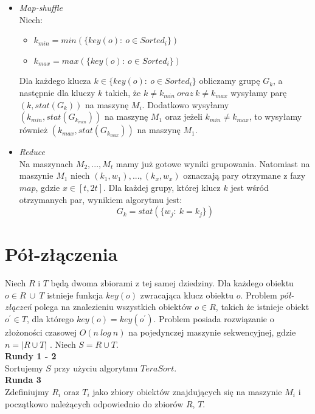 \documentclass[licencjacka]{pracamgr}
\begin{document}
\begin{itemize}
    \item \textit{Map-shuffle} \\
    Niech:
    \begin{itemize}
        \item \(k_{min} = min(\{key(o) : \ o \in Sorted_i \})\)
        \item \(k_{max} = max(\{key(o) : \ o \in Sorted_i \})\)
    \end{itemize}
    
    Dla każdego klucza \(k \in \{key(o): \ o \in Sorted_i\}\) obliczamy grupę \(G_k\), a następnie
    dla kluczy \(k\) takich, że \(k \neq k_{min} \ oraz \ k \neq k_{max}\) wysyłamy parę \((k, stat(G_k))\) na maszynę \(M_i\).
    Dodatkowo wysyłamy \((k_{min}, stat(G_{k_{min}}))\) na maszynę \(M_1\) oraz jeżeli \(k_{min} \neq k_{max}\), to wysyłamy również \((k_{max}, stat(G_{k_{max}}))\) na maszynę \(M_1\).

    \item \textit{Reduce} \\
    Na maszynach \(M_2, ..., M_t\) mamy już gotowe wyniki grupowania. Natomiast na maszynie \(M_1\) niech \((k_1, w_1), ..., (k_x, w_x)\) oznaczają pary otrzymane z fazy \(map\), gdzie \(x \in [t, 2t]\). Dla każdej grupy, której klucz \(k\) jest wśród otrzymanych par, wynikiem algorytmu jest:\\
            $$G_k = stat(\{w_j: \ k = k_j\})$$
\end{itemize}
\section{Pół-złączenia}
Niech \(R\) i \(T\) będą dwoma zbiorami z tej samej dziedziny. Dla każdego obiektu \(o \in R \ \cup \  T\) istnieje funkcja \(key(o)\) zwracająca klucz obiektu \(o\). Problem \textit{pół-złączeń} polega na znalezieniu wszystkich obiektów \(o \in R\), takich że istnieje obiekt \(o^\prime \in T\), dla którego \(key(o) = key(o^\prime)\). Problem posiada rozwiązanie o złożoności czasowej \(O(n \ log \  n)\) na pojedynczej maszynie sekwencyjnej, gdzie \(n = |R \cup T|\) \cite{tao2013minimal}.
Niech \(S = R \cup T\). \\

\textbf{Rundy 1 - 2} \\
Sortujemy \(S\) przy użyciu algorytmu \(TeraSort\). \\

\textbf{Runda 3} \\
Zdefiniujmy \(R_i\) oraz \(T_i\) jako zbiory obiektów znajdujących się na maszynie \(M_i\) i początkowo należących odpowiednio do zbiorów \(R\), \(T\).
\end{document}
